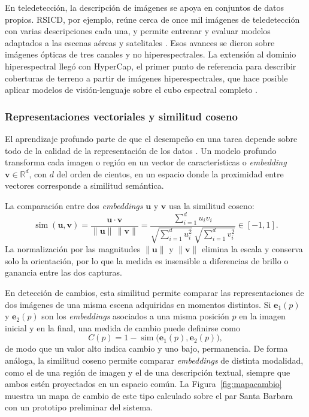 En teledetección, la descripción de imágenes se apoya en conjuntos de datos propios. RSICD, por ejemplo, reúne cerca de once mil imágenes de teledetección con varias descripciones cada una, y permite entrenar y evaluar modelos adaptados a las escenas aéreas y satelitales \parencite{lu2017rsicd}. Esos avances se dieron sobre imágenes ópticas de tres canales y no hiperespectrales. La extensión al dominio hiperespectral llegó con HyperCap, el primer punto de referencia para describir coberturas de terreno a partir de imágenes hiperespectrales, que hace posible aplicar modelos de visión-lenguaje sobre el cubo espectral completo \parencite{das2025hypercap}.

\subsubsection{Representaciones vectoriales y similitud coseno}

El aprendizaje profundo parte de que el desempeño en una tarea depende sobre todo de la calidad de la representación de los datos \parencite{bengio2013representation}. Un modelo profundo transforma cada imagen o región en un vector de características o \textit{embedding} $\mathbf{v}\in\mathbb{R}^{d}$, con $d$ del orden de cientos, en un espacio donde la proximidad entre vectores corresponde a similitud semántica.

La comparación entre dos \textit{embeddings} $\mathbf{u}$ y $\mathbf{v}$ usa la similitud coseno:
\begin{equation}
\operatorname{sim}(\mathbf{u},\mathbf{v})=\frac{\mathbf{u}\cdot\mathbf{v}}{\lVert\mathbf{u}\rVert\,\lVert\mathbf{v}\rVert}=\frac{\sum_{i=1}^{d}u_i v_i}{\sqrt{\sum_{i=1}^{d}u_i^{2}}\,\sqrt{\sum_{i=1}^{d}v_i^{2}}}\in[-1,1].
\end{equation}
La normalización por las magnitudes $\lVert\mathbf{u}\rVert$ y $\lVert\mathbf{v}\rVert$ elimina la escala y conserva solo la orientación, por lo que la medida es insensible a diferencias de brillo o ganancia entre las dos capturas.

En detección de cambios, esta similitud permite comparar las representaciones de dos imágenes de una misma escena adquiridas en momentos distintos. Si $\mathbf{e}_1(p)$ y $\mathbf{e}_2(p)$ son los \textit{embeddings} asociados a una misma posición $p$ en la imagen inicial y en la final, una medida de cambio puede definirse como
\begin{equation}
C(p)=1-\operatorname{sim}\!\big(\mathbf{e}_1(p),\mathbf{e}_2(p)\big),
\end{equation}
de modo que un valor alto indica cambio y uno bajo, permanencia. De forma análoga, la similitud coseno permite comparar \textit{embeddings} de distinta modalidad, como el de una región de imagen y el de una descripción textual, siempre que ambos estén proyectados en un espacio común. La Figura~\ref{fig:mapacambio} muestra un mapa de cambio de este tipo calculado sobre el par Santa Barbara con un prototipo preliminar del sistema.

